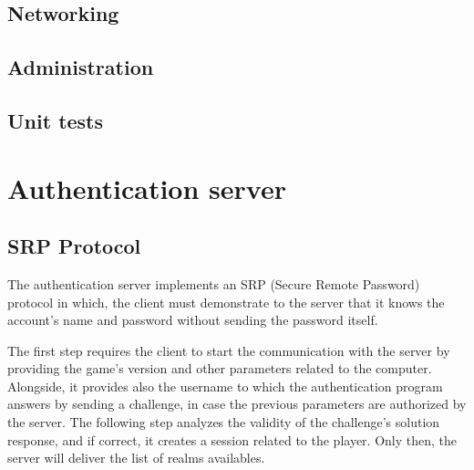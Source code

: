 \documentclass[paper=a4, fontsize=11pt]{scrartcl}
\begin{document}
\subsection{Networking}


\subsection{Administration}


\subsection{Unit tests}

\section{Authentication server}

\subsection{SRP Protocol}
The authentication server implements an SRP (Secure Remote Password) protocol 
in which, the client must demonstrate to the server that it knows the account's 
name and password without sending the password itself.

The first step requires the client to start the communication with the server
by providing the game's version and other parameters related to the computer. 
Alongside, it provides also the username to which the authentication program 
answers by sending a challenge, in case the previous parameters are 
authorized by the server. The following step analyzes the validity of the 
challenge's solution response, and if correct, it creates a session related to
the player.
Only then, the server will deliver the list of realms availables.
\end{document}
